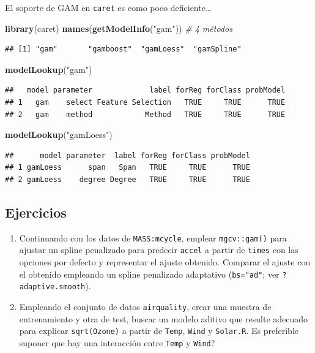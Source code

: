 \documentclass[
  spanish,
]{book}
\newenvironment{Shaded}{\begin{snugshade}}{\end{snugshade}}
\newcommand{\CommentTok}[1]{\textcolor[rgb]{0.56,0.35,0.01}{\textit{#1}}}
\newcommand{\KeywordTok}[1]{\textcolor[rgb]{0.13,0.29,0.53}{\textbf{#1}}}
\newcommand{\NormalTok}[1]{#1}
\newcommand{\StringTok}[1]{\textcolor[rgb]{0.31,0.60,0.02}{#1}}
\theoremstyle{break}
\theoremstyle{definition}
\theoremstyle{definition}
\theoremstyle{definition}
\theoremstyle{remark}
\begin{document}
El soporte de GAM en \texttt{caret} es como poco deficiente\ldots{}

\begin{Shaded}
\begin{Highlighting}[]
\KeywordTok{library}\NormalTok{(caret)}
\KeywordTok{names}\NormalTok{(}\KeywordTok{getModelInfo}\NormalTok{(}\StringTok{"gam"}\NormalTok{)) }\CommentTok{# 4 métodos}
\end{Highlighting}
\end{Shaded}

\begin{verbatim}
## [1] "gam"       "gamboost"  "gamLoess"  "gamSpline"
\end{verbatim}

\begin{Shaded}
\begin{Highlighting}[]
\KeywordTok{modelLookup}\NormalTok{(}\StringTok{"gam"}\NormalTok{)}
\end{Highlighting}
\end{Shaded}

\begin{verbatim}
##   model parameter             label forReg forClass probModel
## 1   gam    select Feature Selection   TRUE     TRUE      TRUE
## 2   gam    method            Method   TRUE     TRUE      TRUE
\end{verbatim}

\begin{Shaded}
\begin{Highlighting}[]
\KeywordTok{modelLookup}\NormalTok{(}\StringTok{"gamLoess"}\NormalTok{)}
\end{Highlighting}
\end{Shaded}

\begin{verbatim}
##      model parameter  label forReg forClass probModel
## 1 gamLoess      span   Span   TRUE     TRUE      TRUE
## 2 gamLoess    degree Degree   TRUE     TRUE      TRUE
\end{verbatim}

\hypertarget{ejercicios}{%
\subsection{Ejercicios}\label{ejercicios}}

\begin{enumerate}
\def\labelenumi{\arabic{enumi}.}
\item
  Continuando con los datos de \texttt{MASS:mcycle}, emplear \texttt{mgcv::gam()} para ajustar un spline penalizado para predecir \texttt{accel} a partir de \texttt{times} con las opciones por defecto y representar el ajuste obtenido. Comparar el ajuste con el obtenido empleando un spline penalizado adaptativo (\texttt{bs="ad"}; ver \texttt{?adaptive.smooth}).
\item
  Empleando el conjunto de datos \texttt{airquality}, crear una muestra de entrenamiento y otra de test, buscar un modelo aditivo que resulte adecuado para explicar \texttt{sqrt(Ozone)} a partir de \texttt{Temp}, \texttt{Wind} y \texttt{Solar.R}.
  Es preferible suponer que hay una interacción entre \texttt{Temp} y \texttt{Wind}?
\end{enumerate}
\end{document}
